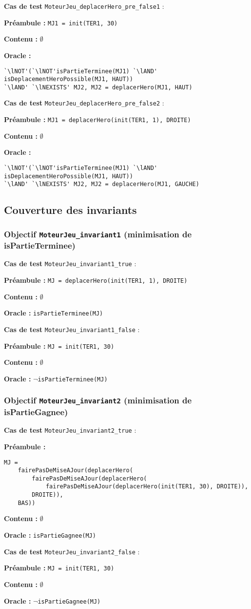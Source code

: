 \documentclass{article}
\newcommand{\cmd}[1]{\texttt{#1}}
\newcommand{\lAND}{$\land$}
\newcommand{\lNOT}{$\lnot$}
\newcommand{\lNEXISTS}{$\nexists{}$}
\newcommand{\obj}[2]{\subsubsection*{\large{\textbf{Objectif {\cmd{#1} (#2)}}}}}
\newenvironment{cas}[1]
{
	\hspace{1em}\textbf{Cas de test} \cmd{#1} :
	\begin{list}{}{}
}{
	\end{list}\vspace{1em}
}
\newcommand{\pre}[1]{\item \textbf{Préambule :} \cmd{#1}}
\newcommand{\nope}{\item \textbf{Contenu :} $\emptyset$}
\newcommand{\ora}[1]{\item \textbf{Oracle :} \cmd{#1}}
\newcommand{\oram}{\item \textbf{Oracle :}}
\newcommand{\prem}{\item \textbf{Préambule :}}
\begin{document}
	\begin{cas} {MoteurJeu\_deplacerHero\_pre\_false1}
		\pre{MJ1 = init(TER1, 30)}
		\nope{}
		\oram{}
		\begin{lstlisting}
`\lNOT'(`\lNOT'isPartieTerminee(MJ1) `\lAND' isDeplacementHeroPossible(MJ1, HAUT))
`\lAND' `\lNEXISTS' MJ2, MJ2 = deplacerHero(MJ1, HAUT)
		\end{lstlisting}
	\end{cas}

	\begin{cas} {MoteurJeu\_deplacerHero\_pre\_false2}
		\pre{MJ1 = deplacerHero(init(TER1, 1), DROITE)}
		\nope{}
		\oram{}
		\begin{lstlisting}
`\lNOT'(`\lNOT'isPartieTerminee(MJ1) `\lAND' isDeplacementHeroPossible(MJ1, HAUT))
`\lAND' `\lNEXISTS' MJ2, MJ2 = deplacerHero(MJ1, GAUCHE)
		\end{lstlisting}
	\end{cas}


\subsection{Couverture des invariants}

\obj{MoteurJeu\_invariant1} {minimisation de isPartieTerminee}
	\begin{cas} {MoteurJeu\_invariant1\_true}
		\pre{MJ = deplacerHero(init(TER1, 1), DROITE)}
		\nope{}
		\ora{isPartieTerminee(MJ)}
	\end{cas}

	\begin{cas} {MoteurJeu\_invariant1\_false}
		\pre{MJ = init(TER1, 30)}
		\nope{}
		\ora{\lNOT{}isPartieTerminee(MJ)}
	\end{cas}

\obj{MoteurJeu\_invariant2} {minimisation de isPartieGagnee}
	\begin{cas} {MoteurJeu\_invariant2\_true}
		\prem{}
		\begin{lstlisting}
MJ =
	fairePasDeMiseAJour(deplacerHero(
		fairePasDeMiseAJour(deplacerHero(
			fairePasDeMiseAJour(deplacerHero(init(TER1, 30), DROITE)),
		DROITE)),
	BAS))
		\end{lstlisting}
		\nope{}
		\ora{isPartieGagnee(MJ)}
	\end{cas}

	\begin{cas} {MoteurJeu\_invariant2\_false}
		\pre{MJ = init(TER1, 30)}
		\nope{}
		\ora{\lNOT{}isPartieGagnee(MJ)}
	\end{cas}
\end{document}
